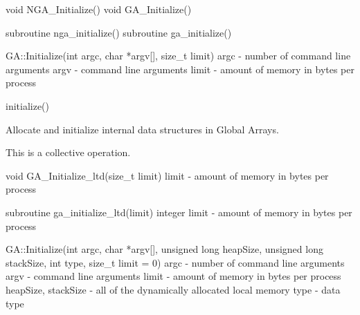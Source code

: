 \documentclass[12pt]{article}
\begin{document}

\begin{capi}
void NGA_Initialize()
void GA_Initialize()
\end{capi}

\begin{fapi}
subroutine nga_initialize()
subroutine ga_initialize()
\end{fapi}

\begin{cxxapi}
GA::Initialize(int argc, char *argv[], size_t limit)
   argc                  - number of command line arguments              \access{[input]}
   argv                  - command line arguments                        \access{[input]}
   limit                 - amount of memory in bytes per process         \access{[input]}
\end{cxxapi}

\begin{pyapi}
initialize()
\end{pyapi}

\begin{desc}

Allocate and initialize internal data structures in Global Arrays.

This is a collective operation.

\end{desc}



\begin{capi}
void GA_Initialize_ltd(size_t limit)
   limit                 - amount of memory in bytes per process          \access{[input]} 
\end{capi}

\begin{fapi}
subroutine ga_initialize_ltd(limit)
   integer limit         - amount of memory in bytes 
                           per process                                    \access{[input]} 
\end{fapi}

\begin{cxxapi}
GA::Initialize(int argc, char *argv[], unsigned long heapSize,
               unsigned long stackSize, int type, size_t limit = 0)
   argc                  - number of command line arguments               \access{[input]}
   argv                  - command line arguments                         \access{[input]}
   limit                 - amount of memory in bytes per process          \access{[input]}
   heapSize, stackSize   - all of the dynamically allocated local memory  \access{[input]}
   type                  - data type                                      \access{[input]}
\end{cxxapi}
\end{document}
